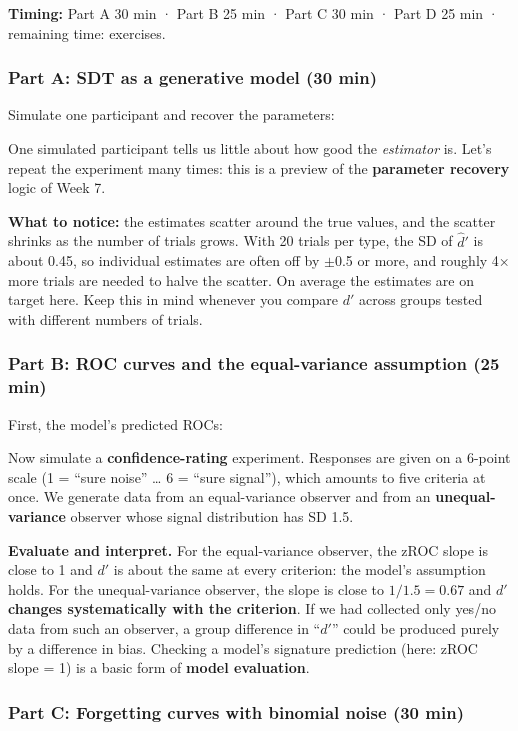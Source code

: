 \textbf{Timing:} Part A 30 min · Part B 25 min · Part C 30 min · Part D
25 min · remaining time: exercises.

\subsubsection{Part A: SDT as a generative model (30 min)}

Simulate one participant and recover the parameters:

One simulated participant tells us little about how good the
\emph{estimator} is. Let's repeat the experiment many times: this is a
preview of the \textbf{parameter recovery} logic of Week 7.

\textbf{What to notice:} the estimates scatter around the true values,
and the scatter shrinks as the number of trials grows. With 20 trials
per type, the SD of \(\hat d'\) is about 0.45, so individual estimates
are often off by \ensuremath{\pm}0.5 or more, and roughly 4× more trials are needed to
halve the scatter. On average the estimates are on target here. Keep
this in mind whenever you compare \(d'\) across groups tested with
different numbers of trials.

\subsubsection{Part B: ROC curves and the equal-variance assumption (25
min)}

First, the model's predicted ROCs:

Now simulate a \textbf{confidence-rating} experiment. Responses are
given on a 6-point scale (1 = ``sure noise'' \ldots{} 6 = ``sure
signal''), which amounts to five criteria at once. We generate data from
an equal-variance observer and from an \textbf{unequal-variance}
observer whose signal distribution has SD 1.5.

\textbf{Evaluate and interpret.} For the equal-variance observer, the
zROC slope is close to 1 and \(d'\) is about the same at every
criterion: the model's assumption holds. For the unequal-variance
observer, the slope is close to \(1/1.5 = 0.67\) and \(d'\)
\textbf{changes systematically with the criterion}. If we had collected
only yes/no data from such an observer, a group difference in ``\(d'\)''
could be produced purely by a difference in bias. Checking a model's
signature prediction (here: zROC slope = 1) is a basic form of
\textbf{model evaluation}.

\subsubsection{Part C: Forgetting curves with binomial noise (30 min)}

